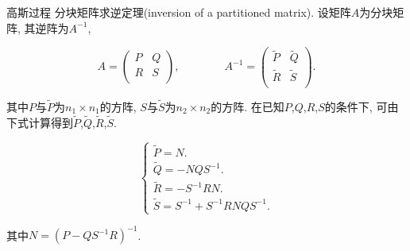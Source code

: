 \begin{frame}[fragile]{高斯过程}
    分块矩阵求逆定理(inversion of a partitioned matrix). 设矩阵$A$为分块矩阵, 其逆阵为$A^{-1}$,

    \begin{equation}
        A=  \begin{pmatrix}
                P & Q \\
                R & S \\
            \end{pmatrix}, \qquad\qquad
        A^{-1}= \begin{pmatrix}
                    \tilde{P} & \tilde{Q} \\
                    \tilde{R} & \tilde{S} \\
                \end{pmatrix}.
    \end{equation}

    其中$P$与$\tilde{P}$为$n_{1}\times n_{1}$的方阵, $S$与$\tilde{S}$为$n_{2}\times n_{2}$的方阵. 在已知$P$,$Q$,$R$,$S$的条件下, 可由下式计算得到$\tilde{P}$,$\tilde{Q}$,$\tilde{R}$,$\tilde{S}$.

    \begin{equation}
        \begin{cases}
            \tilde{P}=N. \\
            \tilde{Q}=-NQS^{-1}. \\ 
            \tilde{R}=-S^{-1}RN. \\
            \tilde{S}=S^{-1}+S^{-1}RNQS^{-1}.
        \end{cases}
    \end{equation}

    其中$N=(P-QS^{-1}R)^{-1}$.
\end{frame}

